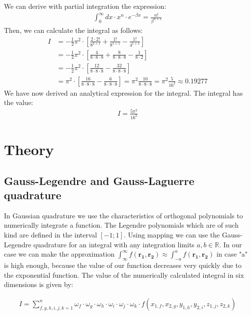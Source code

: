 \documentclass[10pt,a4paper]{article}
\begin{document}
We can derive with partial integration the expression:
\begin{align}
\int_{0}^{\infty} dx \cdot x^n \cdot e^{- \beta x } = \frac{n!}{\beta^{n+1}}
\end{align}
Then, we can calculate the integral as follows:
\begin{align}
I&= -\frac{1}{2} \pi^2 \cdot \left[ \frac{2 \cdot 2!}{8^{2+1}}+ \frac{1!}{8^{1+1}} - \frac{1!}{4^{1+1}} \right]\\
&= -\frac{1}{2} \pi^2 \cdot \left[ \frac{4}{8 \cdot8 \cdot 8}+ \frac{8}{8 \cdot 8 \cdot 8} - \frac{1}{8 \cdot 2} \right]\\
&= -\frac{1}{2} \pi^2 \cdot \left[ \frac{12}{8 \cdot8 \cdot 8} - \frac{32}{8 \cdot 8 \cdot 8} \right]\\
&= \pi^2 \cdot \left[ \frac{16}{8 \cdot 8 \cdot 8}- \frac{6}{8 \cdot 8 \cdot 8} \right]= \pi^2 \frac{10}{8 \cdot 8 \cdot 8}= \pi^2 \frac{5}{16^2}\approx 0.19277
\end{align}
We have now derived an analytical expression for the integral. The integral has the value:
\begin{align}
I = \frac{5 \pi^2}{16^2}
\end{align}

\section{Theory}
\subsection{Gauss-Legendre and Gauss-Laguerre quadrature}

In Gaussian quadrature we use the characteristics of orthogonal polynomials to numerically integrate a function. The Legendre polynomials which are of such kind are defined in the interval $[-1;1]$. Using mapping we can use the Gauss-Legendre quadrature for an integral with any integration limits $a, b \in \mathbb{R}$. In our case we can make the approximation $\int_{\infty}^{\infty} f(\mathbf{r_1},\mathbf{r_2}) \approx \int_{-a}^{a} f(\mathbf{r_1},\mathbf{r_2})$ in case "a" is high enough, because the value of our function decreases very quickly due to the exponential function. The value of the numerically calculated integral in six dimensions is given by:

\begin{align}
	I = \sum_{f,g,h,i,j,k = 1}^{n}\omega_f \cdot \omega_g \cdot \omega_h \cdot \omega_i \cdot \omega_j \cdot \omega_k \cdot f(x_{1,f} , x_{2,g} , y_{1,h} , y_{2,i} , z_{1,j} , z_{2,k})  
\end{align}
\end{document}
